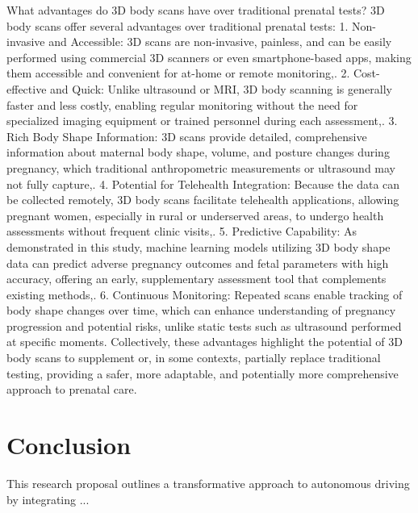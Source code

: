 \documentclass[conference, 12pt]{IEEEtran}
\begin{document}
What advantages do 3D body scans have over traditional prenatal tests?
3D body scans offer several advantages over traditional prenatal tests:
1. Non-invasive and Accessible: 3D scans are non-invasive, painless, and can be easily performed using commercial 3D scanners or even smartphone-based apps, making them accessible and convenient for at-home or remote monitoring,.
2. Cost-effective and Quick: Unlike ultrasound or MRI, 3D body scanning is generally faster and less costly, enabling regular monitoring without the need for specialized imaging equipment or trained personnel during each assessment,.
3. Rich Body Shape Information: 3D scans provide detailed, comprehensive information about maternal body shape, volume, and posture changes during pregnancy, which traditional anthropometric measurements or ultrasound may not fully capture,.
4. Potential for Telehealth Integration: Because the data can be collected remotely, 3D body scans facilitate telehealth applications, allowing pregnant women, especially in rural or underserved areas, to undergo health assessments without frequent clinic visits,.
5. Predictive Capability: As demonstrated in this study, machine learning models utilizing 3D body shape data can predict adverse pregnancy outcomes and fetal parameters with high accuracy, offering an early, supplementary assessment tool that complements existing methods,.
6. Continuous Monitoring: Repeated scans enable tracking of body shape changes over time, which can enhance understanding of pregnancy progression and potential risks, unlike static tests such as ultrasound performed at specific moments.
Collectively, these advantages highlight the potential of 3D body scans to supplement or, in some contexts, partially replace traditional testing, providing a safer, more adaptable, and potentially more comprehensive approach to prenatal care.









\section{Conclusion}

This research proposal outlines a transformative approach to autonomous driving by integrating ...

\newpage
{\small


}
\end{document}
